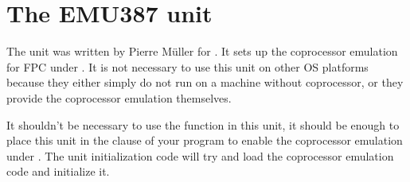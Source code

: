 %
%
%
%
%
\chapter{The EMU387 unit}
The  unit was written by Pierre M\"uller for \dos. It
sets up the coprocessor emulation for FPC under \dos. It is not necessary to
use this unit on other OS platforms because they either simply do not run on 
a machine without coprocessor, or they provide the coprocessor emulation 
themselves.

It shouldn't be necessary to use the function in this unit, it should be
enough to place this unit in the  clause of your program to
enable the coprocessor emulation under \dos. The unit initialization
code will try and load the coprocessor emulation code and initialize it.

